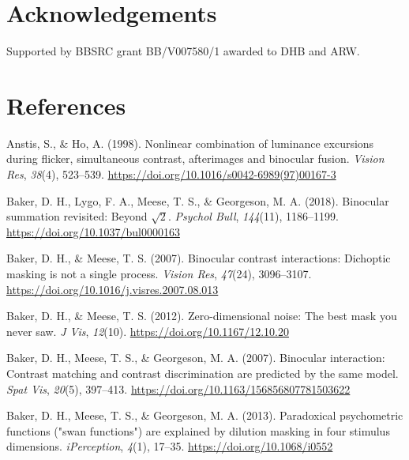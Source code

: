 \documentclass[
]{article}
\newlength{\cslhangindent}
\newlength{\cslentryspacingunit} %
\newenvironment{CSLReferences}[2] %
 {%
  \setlength{\parindent}{0pt}
  \ifodd #1
  \let\oldpar\par
  \def\par{\hangindent=\cslhangindent\oldpar}
  \fi
  \setlength{\parskip}{#2\cslentryspacingunit}
 }%
 {}
\begin{document}
\hypertarget{acknowledgements}{%
\section{Acknowledgements}\label{acknowledgements}}

Supported by BBSRC grant BB/V007580/1 awarded to DHB and ARW.

\hypertarget{references}{%
\section{References}\label{references}}

\hypertarget{refs}{}
\begin{CSLReferences}{1}{0}
\leavevmode{}%
Anstis, S., \& Ho, A. (1998). Nonlinear combination of luminance excursions during flicker, simultaneous contrast, afterimages and binocular fusion. \emph{Vision Res}, \emph{38}(4), 523--539. \url{https://doi.org/10.1016/s0042-6989(97)00167-3}

\leavevmode{}%
Baker, D. H., Lygo, F. A., Meese, T. S., \& Georgeson, M. A. (2018). Binocular summation revisited: Beyond \(\sqrt{2}\). \emph{Psychol Bull}, \emph{144}(11), 1186--1199. \url{https://doi.org/10.1037/bul0000163}

\leavevmode{}%
Baker, D. H., \& Meese, T. S. (2007). Binocular contrast interactions: Dichoptic masking is not a single process. \emph{Vision Res}, \emph{47}(24), 3096--3107. \url{https://doi.org/10.1016/j.visres.2007.08.013}

\leavevmode{}%
Baker, D. H., \& Meese, T. S. (2012). Zero-dimensional noise: The best mask you never saw. \emph{J Vis}, \emph{12}(10). \url{https://doi.org/10.1167/12.10.20}

\leavevmode{}%
Baker, D. H., Meese, T. S., \& Georgeson, M. A. (2007). Binocular interaction: Contrast matching and contrast discrimination are predicted by the same model. \emph{Spat Vis}, \emph{20}(5), 397--413. \url{https://doi.org/10.1163/156856807781503622}

\leavevmode{}%
Baker, D. H., Meese, T. S., \& Georgeson, M. A. (2013). Paradoxical psychometric functions ("swan functions") are explained by dilution masking in four stimulus dimensions. \emph{{iPerception}}, \emph{4}(1), 17--35. \url{https://doi.org/10.1068/i0552}


\end{CSLReferences}
\end{document}
